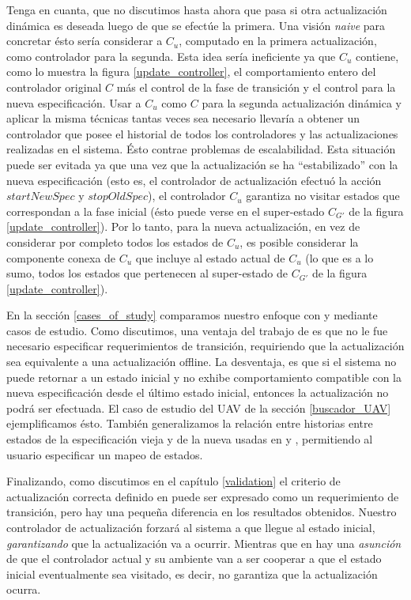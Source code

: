 Tenga en cuanta, que no discutimos hasta ahora que pasa si otra actualización dinámica es deseada luego de que se
efectúe la primera. Una visión \emph{naive} para concretar ésto sería considerar a $C_u$, computado en la primera
actualización, como controlador para la segunda. Esta idea sería ineficiente ya que  $C_u$ contiene, como lo muestra la
figura \ref{update_controller}, el comportamiento entero del controlador original $C$ más el control de la fase de transición y el
control para la nueva especificación. Usar a $C_u$ como $C$ para la segunda actualización dinámica y aplicar la misma
técnicas tantas veces sea necesario llevaría a obtener un controlador que posee el historial de todos los controladores
y las actualizaciones realizadas en el sistema. Ésto contrae problemas de escalabilidad. Esta situación puede ser
evitada ya que una vez que la actualización se ha ``estabilizado'' con la nueva especificación (esto es, el controlador
de actualización efectuó la acción $startNewSpec$ y $stopOldSpec$), el controlador $C_u$ garantiza no visitar estados
que correspondan a la fase inicial (ésto puede verse en el super-estado $C_{G'}$ de la figura \ref{update_controller}).
Por lo tanto, para la nueva actualización, en vez de considerar por completo todos los estados de $C_u$, es posible
considerar la componente conexa de $C_u$ que incluye al estado actual de $C_u$ (lo que es a lo sumo, todos los estados
que pertenecen al super-estado de $C_{G'}$ de la figura \ref{update_controller}).

En la sección \ref{cases_of_study} comparamos nuestro enfoque con \cite{6224401} y
\cite{PanzicaLaManna:2013:FCC:2487336.2487349} mediante casos de estudio. Como discutimos, una ventaja del trabajo de
\cite{6224401} es que no le fue necesario especificar requerimientos de transición, requiriendo que la actualización sea
equivalente a una actualización offline. La desventaja, es que si el sistema no puede retornar a un estado inicial y no
exhibe comportamiento compatible con la nueva especificación desde el último estado inicial, entonces la actualización
no podrá ser efectuada. El caso de estudio del UAV de la sección \ref{buscador_UAV} ejemplificamos ésto. También
generalizamos la relación entre historias entre estados de la especificación vieja y de la nueva usadas en
\cite{6224401} y \cite{PanzicaLaManna:2013:FCC:2487336.2487349}, permitiendo al usuario especificar un mapeo de estados.

Finalizando, como discutimos en el capítulo \ref{validation} el criterio de actualización correcta definido en
\cite{6224401} puede ser expresado como un requerimiento de transición, pero hay una pequeña diferencia en los
resultados obtenidos. Nuestro controlador de actualización forzará al sistema a que llegue al estado inicial,
\emph{garantizando} que la actualización va a ocurrir. Mientras que en \cite{6224401} hay una \emph{asunción} de que el
controlador actual y su ambiente van a ser cooperar a que el estado inicial eventualmente sea visitado, es decir, no
garantiza que la actualización ocurra.
